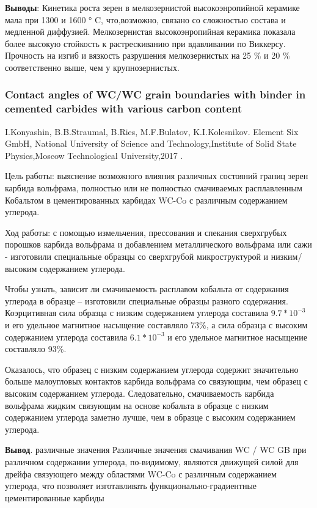 \documentclass[a4paper, 14pt]{article}
\begin{document}
	 \textbf{Выводы}:
	 Кинетика роста зерен в мелкозернистой высокоэнропийной керамике мала при 1300 и
	 1600 ° C, что,возможно, связано со сложностью состава и медленной диффузией.
	 Мелкозернистая высокоэнропийная керамика показала более высокую
	 стойкость к растрескиванию при вдавливании по Виккерсу.
	 Прочность на изгиб и вязкость разрушения мелкозернистых на 25 \% и
	 20 \% соответственно выше, чем у крупнозернистых.
	 
	 \subsubsection{Contact angles of WC/WC grain boundaries with binder in cemented carbides with various carbon content}
	 I.Konyashin, B.B.Straumal, B.Ries, M.F.Bulatov, K.I.Kolesnikov. Element Six GmbH, National University of Science and Technology,Institute of Solid State Physics,Moscow Technological University,2017 \cite{dayana_abstract_2}.
	 
	 Цель работы: выяснение возможного влияния различных состояний границ зерен карбида вольфрама, полностью
	 или не полностью смачиваемых расплавленным Кобальтом в цементированных карбидах WC-Co с различным
	 содержанием углерода.
	 
	 Ход работы: с помощью измельчения, прессования и спекания сверхгрубых порошков карбида вольфрама и
	 добавлением металлического вольфрама или сажи - изготовили специальные образцы со сверхгрубой
	 микроструктурой и низким/высоким содержанием углерода.
	 
	 Чтобы узнать, зависит ли смачиваемость расплавом кобальта от содержания углерода в образце – изготовили
	 специальные образцы разного содержания.
	 Коэрцитивная сила образца с низким содержанием  углерода составила $9.7*10^{-3}$ и его удельное
	  магнитное насыщение составляло 73\%, а сила образца с
	 высоким содержанием углерода составила $6.1*10^{-3}$ и его удельное магнитное насыщение
	 составляло 93\%.
	 
	 Оказалось, что образец с низким содержанием
	 углерода содержит значительно больше малоугловых контактов карбида вольфрама со связующим, чем образец с
	 высоким содержанием углерода. Следовательно, смачиваемость карбида вольфрама жидким связующим на
	 основе кобальта в образце с низким содержанием углерода заметно лучше, чем в образце с высоким содержанием
	 углерода.

	 
	\textbf{Вывод}. различные значения Различные значения смачивания WC / WC GB при различном содержании углерода,
	 по-видимому, являются движущей силой для дрейфа связующего между областями WC-Co с различным
	 содержанием углерода, что позволяет изготавливать функционально-градиентные цементированные карбиды
	 
\end{document}
